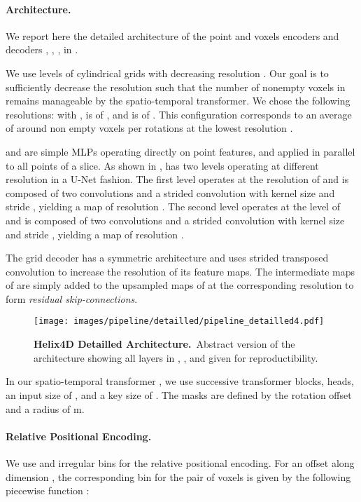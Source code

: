 \documentclass[runningheads]{tpls/llncs}
\begin{document}
\paragraph{Architecture.}
We report here the detailed architecture of the point and voxels encoders and decoders , , ,  in .

We use  levels of cylindrical grids with decreasing resolution . Our goal is to sufficiently decrease the resolution such that the number of nonempty voxels in  remains manageable by the spatio-temporal transformer. We chose the following resolutions:
 with 
,
 is of 
, 
and  is of 
.
This configuration corresponds to an average of around  non empty voxels per rotations at the lowest resolution .

 and  are simple MLPs operating directly on point features, and applied in parallel to all points of a slice.
As shown in ,  has two levels operating at different resolution in a U-Net fashion. The first level operates at the resolution of  and is composed of two  convolutions and a strided convolution
with kernel size  and stride , yielding a map of resolution .
The second level operates at the level of  and is composed of two  convolutions and a strided convolution
with kernel size  and stride , yielding a map of resolution .

The grid decoder has a symmetric architecture and uses strided transposed convolution to increase the resolution of its feature maps. The intermediate maps of   are simply added to the upsampled maps of  at the corresponding resolution to form \emph{residual skip-connections}. 

\begin{figure*}[h]
    \centering
    \texttt{[image: images/pipeline/detailled/pipeline\_detailled4.pdf]}
    \caption{\textbf{Helix4D Detailled Architecture.}~Abstract version of the architecture showing all layers in , ,  and  given for reproductibility.}
    \label{fig:pipeline_detailled}
\end{figure*}

In our spatio-temporal transformer , we use  successive transformer blocks,  heads, an input size of , and a key size of . The masks are defined by the rotation offset  and a radius of m.

\paragraph{Relative Positional Encoding.}
We use  and  irregular bins for the relative positional encoding.
For an offset  along dimension , the corresponding bin for the pair of voxels  is given by the following piecewise function \cite[Eq~18]{wu2021rethinking}:
\end{document}
